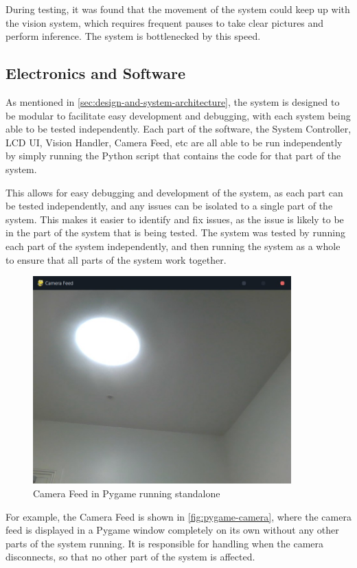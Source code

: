During testing, it was found that the movement of the system could keep up with the vision system, which requires frequent pauses to take clear pictures and perform inference. The system is bottlenecked by this speed.

\subsection{Electronics and Software}
\label{sec:electronics-and-software-evaluation}
As mentioned in \autoref{sec:design-and-system-architecture}, the system is designed to be modular to facilitate easy development and debugging, with each system being able to be tested independently. Each part of the software, the System Controller, LCD UI, Vision Handler, Camera Feed, etc are all able to be run independently by simply running the Python script that contains the code for that part of the system.

This allows for easy debugging and development of the system, as each part can be tested independently, and any issues can be isolated to a single part of the system. This makes it easier to identify and fix issues, as the issue is likely to be in the part of the system that is being tested. The system was tested by running each part of the system independently, and then running the system as a whole to ensure that all parts of the system work together.

\begin{figure}[H]
  \centering
  \includegraphics[height=8cm]{imgs/software/pygamecamera.jpg}
  \caption{Camera Feed in Pygame running standalone}
  \label{fig:pygame-camera}
\end{figure}

For example, the Camera Feed is shown in \autoref{fig:pygame-camera}, where the camera feed is displayed in a Pygame window completely on its own without any other parts of the system running. It is responsible for handling when the camera disconnects, so that no other part of the system is affected. 

